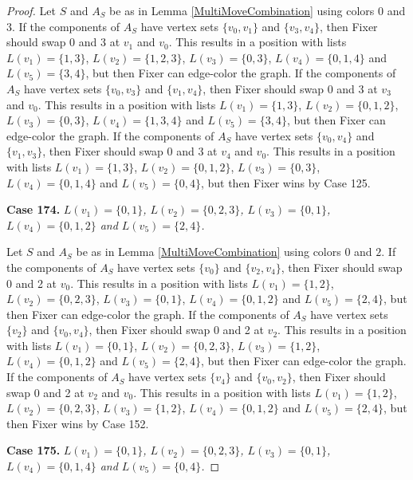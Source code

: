 \documentclass[12pt]{amsart}
\theoremstyle{plain}
\theoremstyle{definition}
\theoremstyle{remark}
\begin{document}
\begin{proof}
Let $S$ and $A_S$ be as in Lemma \ref{MultiMoveCombination} using colors $0$ and $3$. If the components of $A_S$ have vertex sets $\{v_0, v_1\}$ and $\{v_3, v_4\}$, then Fixer should swap 0 and 3 at $v_1$ and $v_0$. This results in a position with lists $L(v_1) = \{1, 3\}$, $L(v_2) = \{1, 2, 3\}$, $L(v_3) = \{0, 3\}$, $L(v_4) = \{0, 1, 4\}$ and $L(v_5) = \{3, 4\}$, but then Fixer can edge-color the graph.
If the components of $A_S$ have vertex sets $\{v_0, v_3\}$ and $\{v_1, v_4\}$, then Fixer should swap 0 and 3 at $v_3$ and $v_0$. This results in a position with lists $L(v_1) = \{1, 3\}$, $L(v_2) = \{0, 1, 2\}$, $L(v_3) = \{0, 3\}$, $L(v_4) = \{1, 3, 4\}$ and $L(v_5) = \{3, 4\}$, but then Fixer can edge-color the graph.
If the components of $A_S$ have vertex sets $\{v_0, v_4\}$ and $\{v_1, v_3\}$, then Fixer should swap 0 and 3 at $v_4$ and $v_0$. This results in a position with lists $L(v_1) = \{1, 3\}$, $L(v_2) = \{0, 1, 2\}$, $L(v_3) = \{0, 3\}$, $L(v_4) = \{0, 1, 4\}$ and $L(v_5) = \{0, 4\}$, but then Fixer wins by Case 125.

\noindent\textbf{Case 174.  }\textit{$L(v_1) = \{0, 1\}$, $L(v_2) = \{0, 2, 3\}$, $L(v_3) = \{0, 1\}$, $L(v_4) = \{0, 1, 2\}$ and $L(v_5) = \{2, 4\}$.}

Let $S$ and $A_S$ be as in Lemma \ref{MultiMoveCombination} using colors $0$ and $2$. If the components of $A_S$ have vertex sets $\{v_0\}$ and $\{v_2, v_4\}$, then Fixer should swap 0 and 2 at $v_0$. This results in a position with lists $L(v_1) = \{1, 2\}$, $L(v_2) = \{0, 2, 3\}$, $L(v_3) = \{0, 1\}$, $L(v_4) = \{0, 1, 2\}$ and $L(v_5) = \{2, 4\}$, but then Fixer can edge-color the graph.
If the components of $A_S$ have vertex sets $\{v_2\}$ and $\{v_0, v_4\}$, then Fixer should swap 0 and 2 at $v_2$. This results in a position with lists $L(v_1) = \{0, 1\}$, $L(v_2) = \{0, 2, 3\}$, $L(v_3) = \{1, 2\}$, $L(v_4) = \{0, 1, 2\}$ and $L(v_5) = \{2, 4\}$, but then Fixer can edge-color the graph.
If the components of $A_S$ have vertex sets $\{v_4\}$ and $\{v_0, v_2\}$, then Fixer should swap 0 and 2 at $v_2$ and $v_0$. This results in a position with lists $L(v_1) = \{1, 2\}$, $L(v_2) = \{0, 2, 3\}$, $L(v_3) = \{1, 2\}$, $L(v_4) = \{0, 1, 2\}$ and $L(v_5) = \{2, 4\}$, but then Fixer wins by Case 152.

\noindent\textbf{Case 175.  }\textit{$L(v_1) = \{0, 1\}$, $L(v_2) = \{0, 2, 3\}$, $L(v_3) = \{0, 1\}$, $L(v_4) = \{0, 1, 4\}$ and $L(v_5) = \{0, 4\}$.}


\end{proof}
\end{document}
